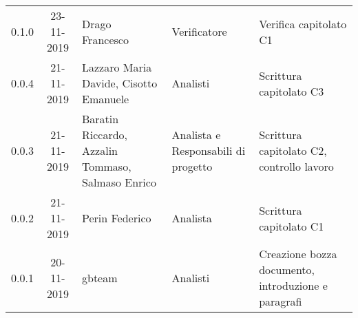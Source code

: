 {\begin{longtable}{ c c  C{4cm}  C{3cm} C{4cm}}
0.1.0 & 23-11-2019 & Drago Francesco & Verificatore & Verifica capitolato C1 \\

0.0.4 & 21-11-2019 & Lazzaro Maria Davide, Cisotto Emanuele & Analisti & Scrittura capitolato C3 \\

0.0.3 & 21-11-2019 & Baratin Riccardo, Azzalin Tommaso, Salmaso Enrico & Analista e Responsabili di progetto & Scrittura capitolato C2, controllo lavoro  \\

0.0.2 & 21-11-2019 & Perin Federico & Analista & Scrittura capitolato C1  \\
		
0.0.1 & 20-11-2019 & gbteam & Analisti & Creazione bozza documento, introduzione e paragrafi \\
		
\end{longtable}
}
